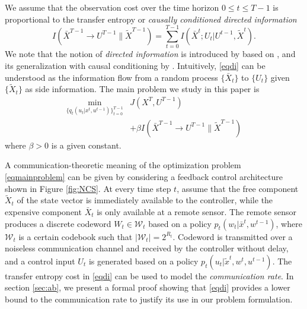 We assume that the observation cost over the time horizon $0\leq t\leq T-1$ is proportional to the transfer entropy or \emph{causally conditioned directed information}
\begin{equation}
\label{eqdi}
I(\bar{X}^{T-1}\rightarrow U^{T-1}\| \tilde{X}^{T-1})=\sum_{t=0}^{T-1} I(\bar{X}^t; U_t|U^{t-1},\tilde{X}^t).
\end{equation}
We note that the notion of \emph{directed information} is introduced by \cite{massey1990causality} based on \cite{marko1973bidirectional}, and its generalization with causal conditioning by \cite{kramer1998causal}. Intuitively, \eqref{eqdi} can be understood as the information flow from a random process $\{\bar{X}_t\}$ to $\{U_t\}$ given $\{\tilde{X}_t\}$ as side information.
The main problem we study in this paper is
\begin{align}
\min_{\{q_t(u_t|x^t,u^{t-1})\}_{t=0}^{T-1}} & J(X^T, U^{T-1}) \nonumber \\
&+\beta I(\bar{X}^{T-1}\rightarrow U^{T-1}\| \tilde{X}^{T-1}) \label{eqmainproblem}
\end{align}
where $\beta>0$ is a given constant.

A communication-theoretic meaning of the optimization problem \eqref{eqmainproblem} can be given by considering a feedback control architecture shown in Figure \ref{fig:NCS}. 
At every time step $t$, assume that the free component $\tilde{X}_t$ of the state vector is immediately available to the controller, while the expensive component $\bar{X}_t$ is only available at a remote sensor. The remote sensor produces a discrete codeword $W_t\in\mathcal{W}_t$ based on a policy $p_t(w_t|\bar{x}^t, w^{t-1})$, where $\mathcal{W}_t$ is a certain codebook such that $|\mathcal{W}_t|=2^{R_t}$. Codeword is transmitted over a noiseless communication channel and received by the controller without delay, and a control input $U_t$ is generated based on a policy $p_t(u_t|\tilde{x}^t, w^t, u^{t-1})$. The transfer entropy cost in \eqref{eqdi} can be used to model the \emph{communication rate}. In section \ref{sec:ab}, we present a formal proof showing that \eqref{eqdi} provides a lower bound to the communication rate to justify its use in our problem formulation.




